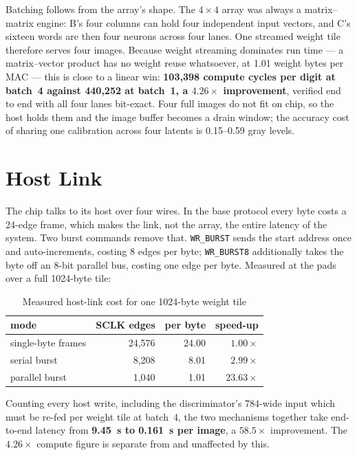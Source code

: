 \documentclass[conference,a4paper]{APSIPA2026}
\begin{document}
Batching follows from the array's shape. The $4\times4$ array was always a matrix--matrix engine: B's four columns can hold four independent input vectors, and C's sixteen words are then four neurons across four lanes. One streamed weight tile therefore serves four images. Because weight streaming dominates run time --- a matrix--vector product has no weight reuse whatsoever, at 1.01 weight bytes per MAC --- this is close to a linear win: \textbf{103{,}398 compute cycles per digit at batch~4 against 440{,}252 at batch~1, a $4.26\times$ improvement}, verified end to end with all four lanes bit-exact. Four full images do not fit on chip, so the host holds them and the image buffer becomes a drain window; the accuracy cost of sharing one calibration across four latents is 0.15--0.59 gray levels.

\section{Host Link}\label{sec:link}
The chip talks to its host over four wires. In the base protocol every byte costs a 24-edge frame, which makes the link, not the array, the entire latency of the system. Two burst commands remove that. \texttt{WR\_BURST} sends the start address once and auto-increments, costing 8 edges per byte; \texttt{WR\_BURST8} additionally takes the byte off an 8-bit parallel bus, costing one edge per byte. Measured at the pads over a full 1024-byte tile:

\begin{table}[t]
\centering
\caption{Measured host-link cost for one 1024-byte weight tile}
\label{tab:link}
\begin{tabular}{lrrr}
\toprule
mode & SCLK edges & per byte & speed-up \\
\midrule
single-byte frames & 24{,}576 & 24.00 & $1.00\times$ \\
serial burst       &  8{,}208 &  8.01 & $2.99\times$ \\
parallel burst     &  1{,}040 &  1.01 & $23.63\times$ \\
\bottomrule
\end{tabular}
\end{table}

Counting every host write, including the discriminator's 784-wide input which must be re-fed per weight tile at batch~4, the two mechanisms together take end-to-end latency from \textbf{9.45~s to 0.161~s per image}, a $58.5\times$ improvement. The $4.26\times$ compute figure is separate from and unaffected by this.
\end{document}
